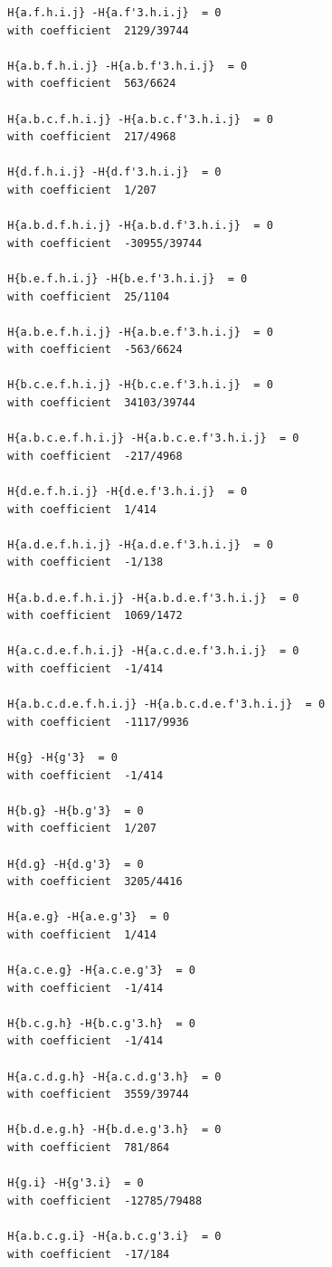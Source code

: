\documentclass[11pt, a4paper]{kybernetika}
\begin{document}
\begin{verbatim}
		H{a.f.h.i.j} -H{a.f'3.h.i.j}  = 0
		with coefficient  2129/39744
		
		H{a.b.f.h.i.j} -H{a.b.f'3.h.i.j}  = 0
		with coefficient  563/6624
		
		H{a.b.c.f.h.i.j} -H{a.b.c.f'3.h.i.j}  = 0
		with coefficient  217/4968
		
		H{d.f.h.i.j} -H{d.f'3.h.i.j}  = 0
		with coefficient  1/207
		
		H{a.b.d.f.h.i.j} -H{a.b.d.f'3.h.i.j}  = 0
		with coefficient  -30955/39744
		
		H{b.e.f.h.i.j} -H{b.e.f'3.h.i.j}  = 0
		with coefficient  25/1104
		
		H{a.b.e.f.h.i.j} -H{a.b.e.f'3.h.i.j}  = 0
		with coefficient  -563/6624
		
		H{b.c.e.f.h.i.j} -H{b.c.e.f'3.h.i.j}  = 0
		with coefficient  34103/39744
		
		H{a.b.c.e.f.h.i.j} -H{a.b.c.e.f'3.h.i.j}  = 0
		with coefficient  -217/4968
		
		H{d.e.f.h.i.j} -H{d.e.f'3.h.i.j}  = 0
		with coefficient  1/414
		
		H{a.d.e.f.h.i.j} -H{a.d.e.f'3.h.i.j}  = 0
		with coefficient  -1/138
		
		H{a.b.d.e.f.h.i.j} -H{a.b.d.e.f'3.h.i.j}  = 0
		with coefficient  1069/1472
		
		H{a.c.d.e.f.h.i.j} -H{a.c.d.e.f'3.h.i.j}  = 0
		with coefficient  -1/414
		
		H{a.b.c.d.e.f.h.i.j} -H{a.b.c.d.e.f'3.h.i.j}  = 0
		with coefficient  -1117/9936
		
		H{g} -H{g'3}  = 0
		with coefficient  -1/414
		
		H{b.g} -H{b.g'3}  = 0
		with coefficient  1/207
		
		H{d.g} -H{d.g'3}  = 0
		with coefficient  3205/4416
		
		H{a.e.g} -H{a.e.g'3}  = 0
		with coefficient  1/414
		
		H{a.c.e.g} -H{a.c.e.g'3}  = 0
		with coefficient  -1/414
		
		H{b.c.g.h} -H{b.c.g'3.h}  = 0
		with coefficient  -1/414
		
		H{a.c.d.g.h} -H{a.c.d.g'3.h}  = 0
		with coefficient  3559/39744
		
		H{b.d.e.g.h} -H{b.d.e.g'3.h}  = 0
		with coefficient  781/864
		
		H{g.i} -H{g'3.i}  = 0
		with coefficient  -12785/79488
		
		H{a.b.c.g.i} -H{a.b.c.g'3.i}  = 0
		with coefficient  -17/184
		

\end{verbatim}
\end{document}
